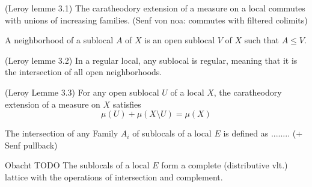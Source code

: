 \begin{lemma}
(Leroy lemme 3.1)
    \label{lem:commutes_with_sup}
    The caratheodory extension of a measure on a local commutes with unions of increasing families.
    (Senf von noa: commutes with filtered colimits)
\end{lemma}



\begin{definition}
    \label{def:regular_local}
\end{definition}



\begin{definition}[Neighborhood]
    \label{def:neighborhood}
    A neighborhood of a sublocal $A$ of $X$ is an open sublocal $V$ of $X$ such that $A \le V$.
\end{definition}

\begin{lemma}
(Leroy lemme 3.2)
    \label{lem:regularity_of_sublocals}
    In a regular local, any sublocal is regular, meaning that it is the intersection of all open neighborhoods.
\end{lemma}


\begin{lemma}[Property 1]
(Leroy Lemme 3.3)
    \label{lem:property_1}
    For any open sublocal $U$ of a local $X$, the caratheodory extension of a measure on $X$ satisfies \[\mu(U) + \mu(X \setminus U) = \mu(X)\]
\end{lemma}

\begin{definition}[Intersection]
    \label{def:intersection}
    The intersection of any Family $A_i$ of sublocals of a local $E$ is defined as ........ (+ Senf pullback)
\end{definition}

\begin{proposition}
    Obacht TODO
    \label{prop:sublocals_structure}
    The sublocals of a local $E$ form a complete (distributive vlt.) lattice with the operations of intersection and complement.
\end{proposition}


